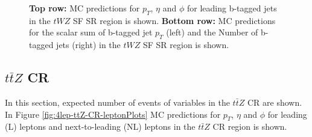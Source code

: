 \begin{figure}[htbp]
    \caption{\textbf{Top row:} MC predictions for $p_{T}$, $\eta$ and $\phi$ for leading b-tagged jets in the $tWZ$ SF SR region  is shown. \textbf{Bottom row:} MC predictions for the scalar sum of b-tagged jet $p_{T}$ (left) and the Number of b-tagged jets (right) in the $tWZ$ SF SR region  is shown.}
  \label{fig:4lep-SF-SR-bjetPlots}
\end{figure}

\subsection{$t\bar{t}Z$ CR}
\label{sec:controlplotstetralepton-ttZ-CR}


In this section, expected number of events of variables in the $t\bar{t}Z$ CR are shown.\\

In Figure \ref{fig:4lep-ttZ-CR-leptonPlots} MC predictions for $p_{T}$, $\eta$ and $\phi$ for leading (L) leptons and next-to-leading (NL) leptons in the $t\bar{t}Z$ CR region is shown.

